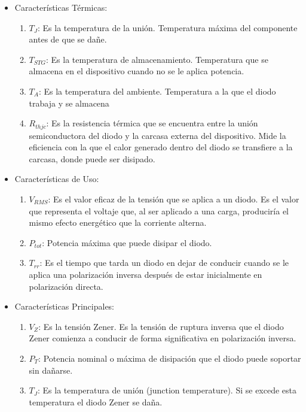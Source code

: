 \documentclass[chaptersright]{informeutn}
\begin{document}
\begin{itemize}
\begin{enumerate}
\begin{enumerate}
                        \end{enumerate}
                \end{enumerate}
            \item Características Térmicas:
                \begin{enumerate}
                    \item $T_J$: Es la temperatura de la unión. Temperatura máxima del componente antes de que se dañe.
                    \item $T_{STG}$: Es la temperatura de almacenamiento. Temperatura que se almacena en el dispositivo cuando no se le aplica potencia.
                    \item $T_A$: Es la temperatura del ambiente. Temperatura a la que el diodo trabaja y se almacena
                    \item $R_{thjc}$: Es la resistencia térmica que se encuentra entre la unión semiconductora del diodo y la carcasa externa del dispositivo. Mide la eficiencia con la que el calor generado dentro del diodo se transfiere a la carcasa, donde puede ser disipado. 
                \end{enumerate}
            \item Características de Uso:
                \begin{enumerate}
                    \item $V_{RMS}$: Es el valor eficaz de la tensión que se aplica a un diodo. Es el valor que representa el voltaje que, al ser aplicado a una carga, produciría el mismo efecto energético que la corriente alterna.
                    \item $P_{tot}$: Potencia máxima que puede disipar el diodo.
                    \item $T_{rr}$: Es el tiempo que tarda un diodo en dejar de conducir cuando se le aplica una polarización inversa después de estar inicialmente en polarización directa.
                \end{enumerate}
            \item Características Principales:
                \begin{enumerate}
                    \item $V_Z$: Es la tensión Zener. Es la tensión de ruptura inversa que el diodo Zener comienza a conducir de forma significativa en polarización inversa.
                    \item $P_T$: Potencia nominal o máxima de disipación que el diodo puede soportar sin dañarse.
                    \item $T_J$: Es la temperatura de unión (junction temperature). Si se excede esta temperatura el diodo Zener se daña.

\end{enumerate}
\end{itemize}
\end{document}
